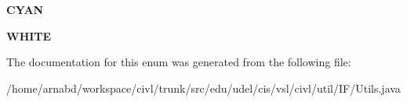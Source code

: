 \begin{DoxyCompactItemize}
\item 
\hypertarget{enumedu_1_1udel_1_1cis_1_1vsl_1_1civl_1_1util_1_1IF_1_1Utils_1_1Color_aaf8fb1d9bad641364c9a1e2445386164}{}{\bfseries C\+Y\+A\+N}\label{enumedu_1_1udel_1_1cis_1_1vsl_1_1civl_1_1util_1_1IF_1_1Utils_1_1Color_aaf8fb1d9bad641364c9a1e2445386164}

\item 
\hypertarget{enumedu_1_1udel_1_1cis_1_1vsl_1_1civl_1_1util_1_1IF_1_1Utils_1_1Color_accd801ab15d59f2e9779d769c2c7d31f}{}{\bfseries W\+H\+I\+T\+E}\label{enumedu_1_1udel_1_1cis_1_1vsl_1_1civl_1_1util_1_1IF_1_1Utils_1_1Color_accd801ab15d59f2e9779d769c2c7d31f}

\end{DoxyCompactItemize}


The documentation for this enum was generated from the following file\+:\begin{DoxyCompactItemize}
\item 
/home/arnabd/workspace/civl/trunk/src/edu/udel/cis/vsl/civl/util/\+I\+F/Utils.\+java\end{DoxyCompactItemize}

